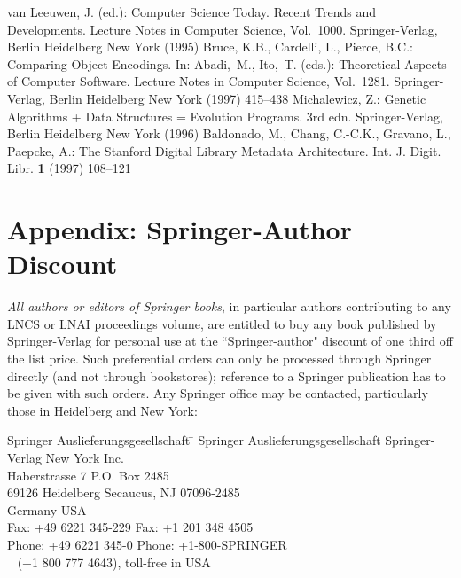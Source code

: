 \documentclass[runningheads]{llncs}
\begin{document}
\begin{thebibliography}{4}
%
van Leeuwen, J. (ed.):
Computer Science Today. Recent Trends and Developments.
Lecture Notes in Computer Science, Vol.~1000.
Springer-Verlag, Berlin Heidelberg New York (1995)
%
Bruce, K.B., Cardelli, L., Pierce, B.C.:
Comparing Object Encodings.
In: Abadi,~M., Ito,~T. (eds.):
Theoretical Aspects of Computer Software.
Lecture Notes in Computer Science, Vol.~1281.
Springer-Verlag, Berlin Heidelberg New York (1997) 415--438
%
Michalewicz, Z.:
Genetic Algorithms + Data Structures = Evolution Programs.
3rd edn. Springer-Verlag, Berlin Heidelberg New York (1996)
%
Baldonado, M., Chang, C.-C.K., Gravano, L., Paepcke, A.:
The Stanford Digital Library Metadata Architecture.
Int. J. Digit. Libr. {\bf 1} (1997) 108--121
%
\end{thebibliography}


\section*{Appendix: Springer-Author Discount}

{\it All authors or editors of Springer books}, in particular authors
contributing to any LNCS or LNAI proceedings volume, are entitled to buy
any book published by Springer-Verlag for personal use at the
``Springer-author" discount of one third off the list price. Such
preferential orders can only be processed through Springer directly
(and not through bookstores); reference to a Springer publication has
to be given with such orders. Any Springer office may be contacted,
particularly those in Heidelberg and New York:

\begin{tabbing}
Springer Auslieferungsgesellschaft \hspace{1cm} \= \kill
Springer Auslieferungsgesellschaft \> Springer-Verlag New York Inc.\\
Haberstrasse 7 \> P.O. Box 2485\\
69126 Heidelberg \> Secaucus, NJ 07096-2485\\
Germany \> USA\\
Fax: +49 6221 345-229 \> Fax:   +1 201 348 4505\\
Phone: +49 6221 345-0 \> Phone: +1-800-SPRINGER\\
~ \> (+1 800 777 4643), toll-free in USA\\
\end{tabbing}
\end{document}
